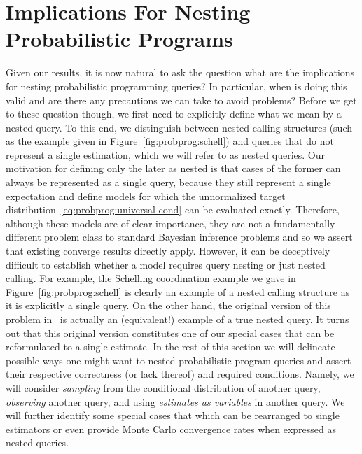 
\section{Implications For Nesting Probabilistic Programs}
\label{sec:design:imp}

Given our results, it is now natural to ask the question what are the implications
for nesting probabilistic programming queries?  In particular, when is doing
this valid and are there any precautions we can take to avoid problems?  Before
we get to these question though, we first need to explicitly define what we
mean by a nested query.  To this end, we distinguish between nested calling
structures (such as the example given in Figure~\ref{fig:probprog:schell}) and
queries that do not represent a single estimation, which we will refer
to as nested queries. Our motivation for defining only the later
as nested is that cases of the former can always be represented as a single
query, because they still represent a single expectation and define models
for which the unnormalized target distribution~\eqref{eq:probprog:universal-cond}
 can be evaluated exactly.  Therefore, although these models are
of clear importance, they are not a fundamentally different problem class
to standard Bayesian inference problems and so we assert that existing \mc
converge results directly apply.  However, it can be deceptively difficult to establish
whether a model requires query nesting or just nested calling.
For example, the Schelling coordination example we gave in Figure~\ref{fig:probprog:schell}
is clearly an example of a nested calling structure as it is explicitly a single query.
On the other hand, the original version of this problem in~\cite[Figure 6]{stuhlmuller2014reasoning}
is actually an (equivalent!) example of a true nested query.  It turns out that this original
version constitutes one of our special cases that can be reformulated to a single estimate.
In the rest of this section we will delineate possible ways one might want
to nested probabilistic program queries and
assert their respective correctness (or lack thereof) and required conditions.
Namely, we will consider \emph{sampling} from the conditional distribution
of another query, \emph{observing} another query, and using \emph{estimates as variables}
in another query.  We will further identify some special cases that which can be rearranged to single estimators or even provide Monte 
Carlo convergence rates when expressed as nested queries.

